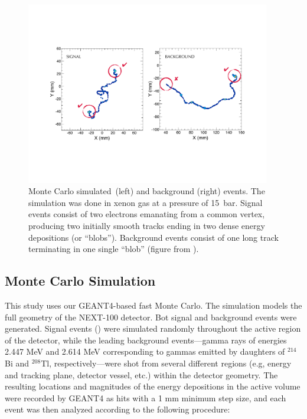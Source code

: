 \documentclass[a4paper,11pt]{article}
\begin{document}
\begin{figure}[!htb]
	\centering
	\includegraphics[width= 0.95\textwidth]{fig/TrackSignature.pdf}
	\caption{Monte Carlo simulated \bbonu\,(left) and background (right) events.  The simulation was done in xenon gas at a pressure of 15~bar. Signal events consist of two electrons emanating
		from a common vertex, producing two initially smooth tracks ending in two dense energy depositions (or ``blobs'').  Background events consist of one long track terminating in one
		single ``blob'' (figure from \cite{MartinAlbo_thesis}).} \label{fig.ETRK2}
\end{figure}

\subsection{Monte Carlo Simulation}\label{ssec:NEXT100MC}
This study uses our GEANT4-based \cite{GEANT4} fast Monte Carlo. The simulation models the full geometry of the NEXT-100 detector.  Bot signal and background events were generated. Signal events (\bbonu) were
simulated randomly throughout the active region of the detector, while the leading background events---gamma rays of energies 2.447 MeV and 2.614 MeV corresponding to gammas emitted by daughters of $^{214}$Bi and $^{208}$Tl,
respectively---were shot from several different regions (e.g, energy and tracking plane, detector vessel, etc.) within the detector geometry. %
The resulting locations and magnitudes of the energy depositions in the active volume were recorded by GEANT4 as hits with a 1 mm minimum step size, and each event was then
analyzed according to the following procedure:
\end{document}
